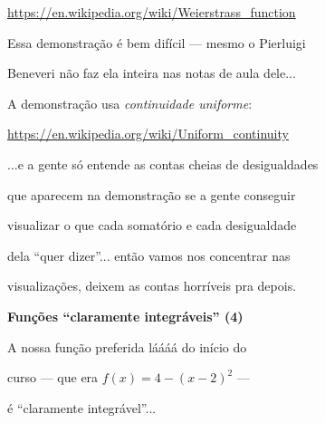 \documentclass[oneside,12pt]{article}
\begin{document}
\ssk

{\footnotesize

\url{https://en.wikipedia.org/wiki/Weierstrass_function}

}

\msk

Essa demonstração é bem difícil --- mesmo o Pierluigi

Beneveri não faz ela inteira nas notas de aula dele...

A demonstração usa {\sl continuidade uniforme}:

\ssk

{\footnotesize

\url{https://en.wikipedia.org/wiki/Uniform_continuity}

}

\msk

...e a gente só entende as contas cheias de desigualdades

que aparecem na demonstração se a gente conseguir

visualizar o que cada somatório e cada desigualdade

dela ``quer dizer''... então vamos nos concentrar nas

visualizações, deixem as contas horríveis pra depois.

\newpage


{\bf Funções ``claramente integráveis'' (4)}

A nossa função preferida láááá do início do

curso --- que era $f(x) = 4 - (x-2)^2$ ---

é ``claramente integrável''...


\pu

\def\fwithapprs#1{%
  \vcenter{\hbox{%
    \beginpicture(0,0)(4,4)
    \pictgrid%
    #1%
    \pictpiecewise{%
      (0,0)--%
      (0.25,0.938)--%
      (0.5,1.75)--%
      (0.75,2.438)--%
      (1,3)--%
      (1.25,3.438)--%
      (1.5,3.75)--%
      (1.75,3.938)--%
      (2,4)--%
      (2.25,3.938)--%
      (2.5,3.75)--%
      (2.75,3.438)--%
      (3,3)--%
      (3.25,2.438)--%
      (3.5,1.75)--%
      (3.75,0.938)--%
      (4,0)%
      }%
    \pictaxes%
    \end{picture}%
  }}}
\end{document}
